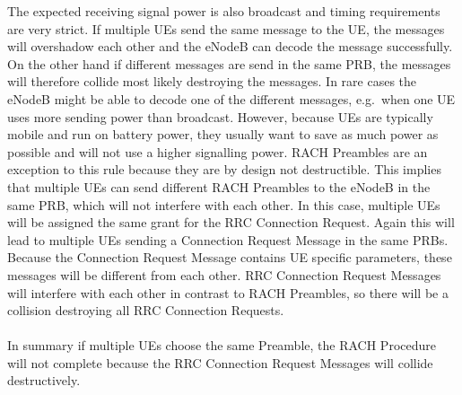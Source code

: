 \documentclass[conference]{IEEEtran}
\begin{document}
The expected receiving signal power is also broadcast and timing requirements are very strict.
If multiple UEs send the same message to the UE, the messages will overshadow each other and the eNodeB can decode the message successfully.
On the other hand if different messages are send in the same PRB, the messages will therefore collide most likely destroying the messages.
In rare cases the eNodeB might be able to decode one of the different messages, e.g.\ when one UE uses more sending power than broadcast.
However, because UEs are typically mobile and run on battery power, they usually want to save as much power as possible and will not use a higher signalling power.
RACH Preambles are an exception to this rule because they are by design not destructible.
This implies that multiple UEs can send different RACH Preambles to the eNodeB in the same PRB, which will not interfere with each other.
In this case, multiple UEs will be assigned the same grant for the RRC Connection Request.
Again this will lead to multiple UEs sending a Connection Request Message in the same PRBs.
Because the Connection Request Message contains UE specific parameters, these messages will be different from each other.
RRC Connection Request Messages will interfere with each other in contrast to RACH Preambles, so there will be a collision destroying all RRC Connection Requests.\\\\
In summary if multiple UEs choose the same Preamble, the RACH Procedure will not complete because the RRC Connection Request Messages will collide destructively.
\end{document}
